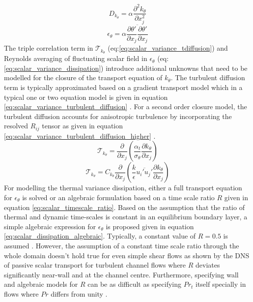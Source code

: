 \begin{equation}
\label{eq:scalar_variance_diffusion}
D_{k_{\theta}} = \alpha\frac{\partial^{2} k_{\theta}}{\partial x_{j}^{2} }
\end{equation}
\begin{equation}
\label{eq:scalar_variance_dissipation}
\epsilon_{\theta} = \alpha \overline{\frac{\partial \theta'}{\partial x_{j}}\frac{\partial \theta'}{\partial x_{j}}}
\end{equation}
The triple correlation term in $\mathcal{T}_{k_{\theta}}$ (eq:\ref{eq:scalar_variance_tdiffusion}) and Reynolds averaging of fluctuating scalar field in $\epsilon_{\theta}$ (eq:\ref{eq:scalar_variance_dissipation}) introduce additional unknowns that need to be modelled for the closure of the transport equation of $k_{\theta}$. The turbulent diffusion term is typically approximated based on a gradient transport model which in a typical one or two equation model is given in equation \ref{eq:scalar_variance_turbulent_diffusion} \cite{Launder2001} \cite{Yoder2016}. For a second order closure model, the turbulent diffusion accounts for anisotropic turbulence by incorporating the resolved $R_{ij}$ tensor as given in equation \ref{eq:scalar_variance_turbulent_diffusion_higher} \cite{Leschziner2015}. 
\begin{equation}
\label{eq:scalar_variance_turbulent_diffusion}
\mathcal{T}_{k_{\theta}} = \frac{\partial}{\partial x_{j}}\left(\frac{\alpha_{t}}{\sigma_{\theta}} \frac{\partial k_{\theta}}{\partial x_{j}}\right)
\end{equation}
\begin{equation}
\label{eq:scalar_variance_turbulent_diffusion_higher}
\mathcal{T}_{k_{\theta}} = C_{k_{\theta}}\frac{\partial}{\partial x_{j}}\left(\frac{k}{\epsilon} \overline{u_{i}'u_{j}'} \frac{\partial k_{\theta}}{\partial x_{j}}\right)
\end{equation}
For modelling the thermal variance dissipation, either a full transport equation for $\epsilon_{\theta}$ is solved or an algebraic formulation based on a time scale ratio $R$ given in equation \ref{eq:scalar_timescale_ratio}. Based on the assumption that the ratio of thermal and dynamic time-scales is constant in an equilibrium boundary layer, a simple algebraic expression for $\epsilon_{\theta}$ is proposed given in equation \ref{eq:scalar_dissipation_algebraic}. Typically, a constant value of $R = 0.5$ is assumed \cite{Leschziner2015}. However, the assumption of a constant time scale ratio through the whole domain doesn't hold true for even simple shear flows as shown by the DNS of passive scalar transport for turbulent channel flows \cite{Johansson2000} where $R$ deviates significantly near-wall and at the channel centre. Furthermore, specifying wall and algebraic models for $R$ can be as difficult as specifying $Pr_{t}$ itself specially in flows where $Pr$ differs from unity \cite{Grotzbach2007}. 
